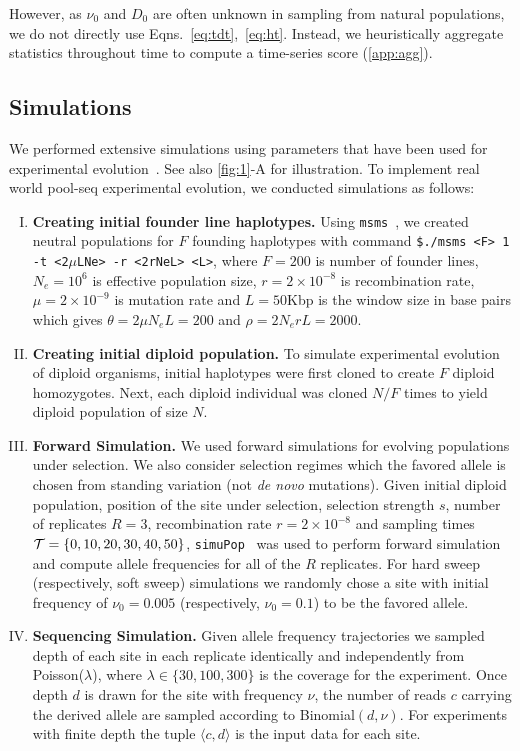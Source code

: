 {However, as $\nu_0$ and $D_0$ are often unknown in sampling from
natural populations, we do not directly use
Eqns.~\ref{eq:tdt},~\ref{eq:ht}. Instead, we heuristically aggregate
statistics throughout time to compute a time-series score
(\ref{app:agg}).
}


		


\subsection{Simulations}\label{sec:sims}
We performed extensive simulations using parameters that have been
used for \dmel experimental
evolution~\cite{kofler2013guide}. See also \ref{fig:1}-A 
for
illustration. To implement real world pool-seq experimental evolution, we 
conducted simulations as follows:
\begin{enumerate}[I.]
\item {\bf Creating initial founder line haplotypes.} Using
  \texttt{msms}~\cite{ewing2010msms}, we created neutral populations for $F$
  founding haplotypes with command \texttt{\$./msms
    <F> 1 -t <2$\mu$LNe> -r <2rNeL> <L>}, where $F=200$ is number of
  founder lines, $N_e=10^6$ is effective population size,
  $r=2\times10^{-8}$ is recombination rate, $\mu=2\times 10^{-9}$ is
  mutation rate and $L=50$Kbp is the window size in base pairs which
  gives $\theta=2\mu N_eL=200$ and $\rho=2N_erL=2000$.
  
\item{\bf Creating initial diploid population.} To simulate
  experimental evolution of diploid organisms, initial haplotypes were
  first cloned to create $F$ diploid homozygotes. Next, each diploid
  individual was cloned $N/F$ times to yield diploid population of
  size $N$.

\item{\bf Forward Simulation.} We used forward simulations for
  evolving populations under selection. We also consider selection
  regimes which the favored allele is chosen from standing
  variation (not \emph{de novo} mutations). Given initial diploid
  population, position of the site under selection, selection strength
  $s$, number of replicates $R=3$, recombination rate
  $r=2\times10^{-8}$ and sampling times ${\cal T}=\{0,10,20,30,40,50\}$,
  \texttt{simuPop}~\cite{peng2005simupop} was used to perform forward
  simulation and compute allele frequencies for all of the $R$
  replicates.  For hard sweep (respectively, soft sweep) simulations
  we randomly chose a site with initial frequency of $\nu_0=0.005$
  (respectively, $\nu_0=0.1$) to be the favored allele.
\item{\bf Sequencing Simulation.} Given allele frequency trajectories
  we sampled depth of each site in each replicate identically and independently 
  from
  Poisson($\lambda$), where $\lambda \in \{30,100,300\}$ is the
  coverage for the experiment. Once depth $d$ is drawn for the site
  with frequency $\nu$, the number of reads $c$ carrying the derived
  allele are sampled according to Binomial$(d,\nu)$. For experiments
  with finite depth the tuple $\langle c,d\rangle$ is the input data
  for each site. 
\end{enumerate}
